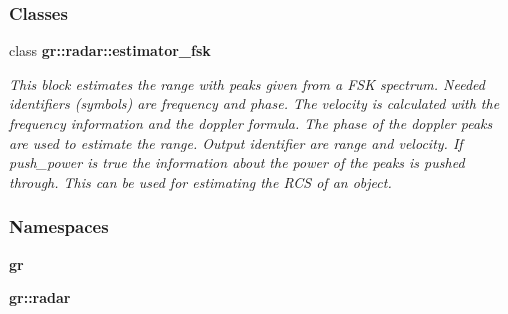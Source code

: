 \subsubsection*{Classes}
\begin{DoxyCompactItemize}
\item 
class {\bf gr\+::radar\+::estimator\+\_\+fsk}
\begin{DoxyCompactList}\small\item\em This block estimates the range with peaks given from a F\+SK spectrum. Needed identifiers (symbols) are \textquotesingle{}frequency\textquotesingle{} and \textquotesingle{}phase\textquotesingle{}. The velocity is calculated with the \textquotesingle{}frequency\textquotesingle{} information and the doppler formula. The phase of the doppler peaks are used to estimate the range. Output identifier are \textquotesingle{}range\textquotesingle{} and \textquotesingle{}velocity\textquotesingle{}. If push\+\_\+power is true the information about the power of the peaks is pushed through. This can be used for estimating the R\+CS of an object. \end{DoxyCompactList}\end{DoxyCompactItemize}
\subsubsection*{Namespaces}
\begin{DoxyCompactItemize}
\item 
 {\bf gr}
\item 
 {\bf gr\+::radar}
\end{DoxyCompactItemize}
